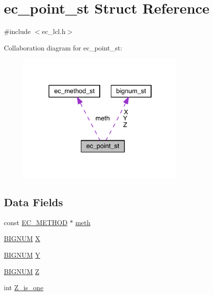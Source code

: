 \hypertarget{structec__point__st}{}\section{ec\+\_\+point\+\_\+st Struct Reference}
\label{structec__point__st}


{\ttfamily \#include $<$ec\+\_\+lcl.\+h$>$}



Collaboration diagram for ec\+\_\+point\+\_\+st\+:\nopagebreak
\begin{figure}[H]
\begin{center}
\leavevmode
\includegraphics[width=238pt]{structec__point__st__coll__graph}
\end{center}
\end{figure}
\subsection*{Data Fields}
\begin{DoxyCompactItemize}
\item 
const \hyperlink{crypto_2ec_2ec_8h_aeb4d9daf18f9bdcdb57abb1d97aa86c0}{E\+C\+\_\+\+M\+E\+T\+H\+OD} $\ast$ \hyperlink{structec__point__st_a2fc1498c0eb6bf4c024e00e73b172708}{meth}
\item 
\hyperlink{crypto_2ossl__typ_8h_a6fb19728907ec6515e4bfb716bffa141}{B\+I\+G\+N\+UM} \hyperlink{structec__point__st_a8522adb36f2b972395a10c6917d18bc8}{X}
\item 
\hyperlink{crypto_2ossl__typ_8h_a6fb19728907ec6515e4bfb716bffa141}{B\+I\+G\+N\+UM} \hyperlink{structec__point__st_ab3bb3b45b5308a35e5f209e4210d9797}{Y}
\item 
\hyperlink{crypto_2ossl__typ_8h_a6fb19728907ec6515e4bfb716bffa141}{B\+I\+G\+N\+UM} \hyperlink{structec__point__st_a074275f81cf5e10e84f6229665e1ec80}{Z}
\item 
int \hyperlink{structec__point__st_ac97ce99b8fe8ae0231dae8db059308ce}{Z\+\_\+is\+\_\+one}
\end{DoxyCompactItemize}


